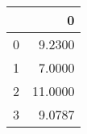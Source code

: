 \begin{tabular}{lr}
\toprule
{} &        0 \\
\midrule
0 &   9.2300 \\
1 &   7.0000 \\
2 &  11.0000 \\
3 &   9.0787 \\
\bottomrule
\end{tabular}
